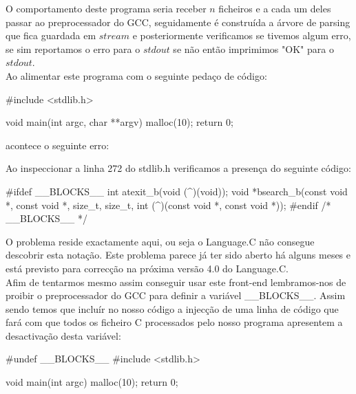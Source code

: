 O comportamento deste programa seria receber $n$ ficheiros e a cada um deles passar ao preprocessador do GCC, seguidamente é construída a árvore de parsing que fica
guardada em $stream$ e posteriormente verificamos se tivemos algum erro, se sim reportamos o erro para o $stdout$ se não então imprimimos "OK" para o $stdout$.\\

Ao alimentar este programa com o seguinte pedaço de código:

\begin{haskell}
#include <stdlib.h>

void main(int argc, char **argv) {
    malloc(10);
    return 0;
}
\end{haskell}

acontece o seguinte erro:


Ao inspeccionar a linha 272 do stdlib.h verificamos a presença do seguinte código:

\begin{haskell}
#ifdef __BLOCKS__
int  atexit_b(void (^)(void));
void    *bsearch_b(const void *, const void *, size_t,
size_t, int (^)(const void *, const void *));
#endif /* __BLOCKS__ */
\end{haskell}

O problema reside exactamente aqui, ou seja o Language.C não consegue descobrir esta notação. Este problema parece já ter sido aberto há alguns meses e está previsto
para correcção na próxima versão 4.0 do Language.C.\\

Afim de tentarmos mesmo assim conseguir usar este front-end lembramos-nos de proibir o preprocessador do GCC para definir a variável \_\_BLOCKS\_\_. Assim sendo
temos que incluír no nosso código a injecção de uma linha de código que fará com que todos os ficheiro C processados pelo nosso programa apresentem a desactivação desta variável:

\begin{haskell}
#undef __BLOCKS__
#include <stdlib.h>

void main(int argc) {
    malloc(10);
    return 0;
}
\end{haskell}

